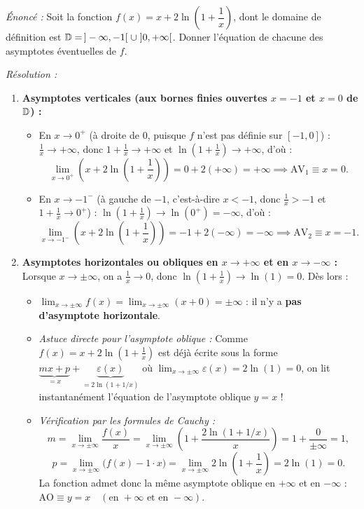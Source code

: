 \begin{exemple}
\emph{Énoncé :} Soit la fonction $f(x) = x + 2\ln\left(1 + \dfrac{1}{x}\right)$, dont le domaine de définition est $\mathbb{D} = \,]-\infty, -1[ \;\cup\; ]0, +\infty[$. Donner l'équation de chacune des asymptotes éventuelles de $f$.

\emph{Résolution :}
\begin{enumerate}
    \item \textbf{Asymptotes verticales (aux bornes finies ouvertes $x = -1$ et $x = 0$ de $\mathbb{D}$) :}
    \begin{itemize}
        \item En $x \to 0^+$ (à droite de $0$, puisque $f$ n'est pas définie sur $[-1, 0]$) : $\frac{1}{x} \to +\infty$, donc $1 + \frac{1}{x} \to +\infty$ et $\ln\left(1+\frac{1}{x}\right) \to +\infty$, d'où :
        \[
            \lim_{x \to 0^+} \left(x + 2\ln\left(1 + \frac{1}{x}\right)\right) = 0 + 2(+\infty) = +\infty \implies \boxed{\text{AV}_1 \equiv x = 0}.
        \]
        \item En $x \to -1^-$ (à gauche de $-1$, c'est-à-dire $x < -1$, donc $\frac{1}{x} > -1$ et $1 + \frac{1}{x} \to 0^+$) : $\ln\left(1+\frac{1}{x}\right) \to \ln(0^+) = -\infty$, d'où :
        \[
            \lim_{x \to -1^-} \left(x + 2\ln\left(1 + \frac{1}{x}\right)\right) = -1 + 2(-\infty) = -\infty \implies \boxed{\text{AV}_2 \equiv x = -1}.
        \]
    \end{itemize}
    \item \textbf{Asymptotes horizontales ou obliques en $x \to +\infty$ et en $x \to -\infty$ :}
    Lorsque $x \to \pm\infty$, on a $\frac{1}{x} \to 0$, donc $\ln\left(1 + \frac{1}{x}\right) \to \ln(1) = 0$. Dès lors :
    \begin{itemize}
        \item $\lim_{x \to \pm\infty} f(x) = \lim_{x \to \pm\infty} (x + 0) = \pm\infty$ : il n'y a \textbf{pas d'asymptote horizontale}.
        \item \emph{Astuce directe pour l'asymptote oblique :} Comme $f(x) = x + 2\ln\left(1+\frac{1}{x}\right)$ est déjà écrite sous la forme $\underbrace{m x + p}_{= x} + \underbrace{\varepsilon(x)}_{= 2\ln(1+1/x)}$ où $\lim_{x \to \pm\infty} \varepsilon(x) = 2\ln(1) = 0$, on lit instantanément l'équation de l'asymptote oblique $y = x$ !
        \item \emph{Vérification par les formules de Cauchy :}
        \[
            m = \lim_{x \to \pm\infty} \frac{f(x)}{x} = \lim_{x \to \pm\infty} \left(1 + \frac{2\ln(1 + 1/x)}{x}\right) = 1 + \frac{0}{\pm\infty} = 1,
        \]
        \[
            p = \lim_{x \to \pm\infty} \bigl(f(x) - 1\cdot x\bigr) = \lim_{x \to \pm\infty} 2\ln\left(1 + \frac{1}{x}\right) = 2\ln(1) = 0.
        \]
        La fonction admet donc la même asymptote oblique en $+\infty$ et en $-\infty$ : $\boxed{\text{AO} \equiv y = x \quad (\text{en } +\infty \text{ et en } -\infty)}$.
    \end{itemize}
\end{enumerate}
\end{exemple}

